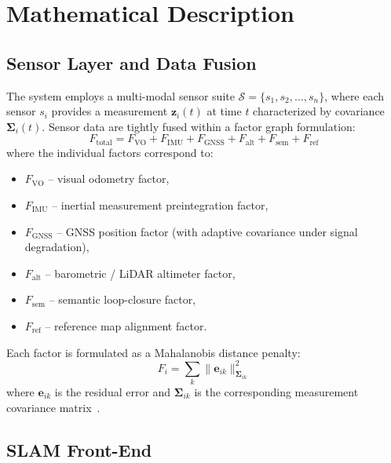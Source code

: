 \section{Mathematical Description}
\label{sec:math_description}

\subsection{Sensor Layer and Data Fusion}
\label{subsec:sensor_fusion}

The system employs a multi-modal sensor suite $\mathcal{S} = \{s_1, s_2, \dots, s_n\}$, where each sensor $s_i$ provides a measurement $\mathbf{z}_i(t)$ at time $t$ characterized by covariance $\mathbf{\Sigma}_i(t)$. Sensor data are tightly fused within a factor graph formulation:
\begin{equation}
  F_{\text{total}} = F_{\text{VO}} + F_{\text{IMU}} + F_{\text{GNSS}} + F_{\text{alt}} + F_{\text{sem}} + F_{\text{ref}}
\end{equation}
where the individual factors correspond to:
\begin{itemize}
  \item $F_{\text{VO}}$ -- visual odometry factor,
  \item $F_{\text{IMU}}$ -- inertial measurement preintegration factor,
  \item $F_{\text{GNSS}}$ -- GNSS position factor (with adaptive covariance under signal degradation),
  \item $F_{\text{alt}}$ -- barometric / LiDAR altimeter factor,
  \item $F_{\text{sem}}$ -- semantic loop-closure factor,
  \item $F_{\text{ref}}$ -- reference map alignment factor.
\end{itemize}
Each factor is formulated as a Mahalanobis distance penalty:
\begin{equation}
  F_i = \sum_k \| \mathbf{e}_{ik} \|_{\mathbf{\Sigma}_{ik}}^2
\end{equation}
where $\mathbf{e}_{ik}$ is the residual error and $\mathbf{\Sigma}_{ik}$ is the corresponding measurement covariance matrix~\cite{liu2024slideslam, tao2024active, liu2022largescale}.

\subsection{SLAM Front-End}
\label{subsec:slam_frontend}

